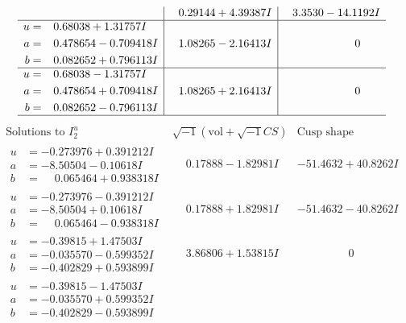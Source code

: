 \documentclass[1p]{elsarticle_modified}
\theoremstyle{definition}
\newcommand{\I}{\sqrt{-1}}
\begin{document}
$$\begin{array}{c|c|c}
 & \phantom{-}0.29144 + 4.39387 I & \phantom{-}3.3530 - 14.1192 I \\ \hline\begin{aligned}
u &= \phantom{-}0.68038 + 1.31757 I \\
a &= \phantom{-}0.478654 - 0.709418 I \\
b &= \phantom{-}0.082652 + 0.796113 I\end{aligned}
 & \phantom{-}1.08265 - 2.16413 I & \phantom{-0.000000 } 0 \\ \hline\begin{aligned}
u &= \phantom{-}0.68038 - 1.31757 I \\
a &= \phantom{-}0.478654 + 0.709418 I \\
b &= \phantom{-}0.082652 - 0.796113 I\end{aligned}
 & \phantom{-}1.08265 + 2.16413 I & \phantom{-0.000000 } 0\\
 \hline 
 \end{array}$$\newpage$$\begin{array}{c|c|c}  
\text{Solutions to }I^u_{2}& \I (\text{vol} + \sqrt{-1}CS) & \text{Cusp shape}\\
 \hline 
\begin{aligned}
u &= -0.273976 + 0.391212 I \\
a &= -8.50504 - 0.10618 I \\
b &= \phantom{-}0.065464 + 0.938318 I\end{aligned}
 & \phantom{-}0.17888 - 1.82981 I & -51.4632 + 40.8262 I \\ \hline\begin{aligned}
u &= -0.273976 - 0.391212 I \\
a &= -8.50504 + 0.10618 I \\
b &= \phantom{-}0.065464 - 0.938318 I\end{aligned}
 & \phantom{-}0.17888 + 1.82981 I & -51.4632 - 40.8262 I \\ \hline\begin{aligned}
u &= -0.39815 + 1.47503 I \\
a &= -0.035570 - 0.599352 I \\
b &= -0.402829 + 0.593899 I\end{aligned}
 & \phantom{-}3.86806 + 1.53815 I & \phantom{-0.000000 } 0 \\ \hline\begin{aligned}
u &= -0.39815 - 1.47503 I \\
a &= -0.035570 + 0.599352 I \\
b &= -0.402829 - 0.593899 I\end{aligned}

\end{array}$$
\end{document}
